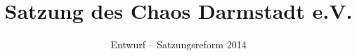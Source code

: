 \documentclass[ngerman]{article}
\begin{document}
\title{Satzung des Chaos Darmstadt e.V.}

\date{Entwurf -- Satzungsreform 2014}

\maketitle
















\end{document}
